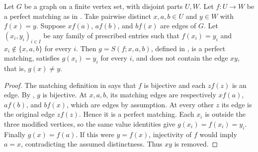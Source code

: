 \begin{lemma}
Let $G$ be a graph on a finite vertex set, with disjoint parts $U,W$.
Let $f:U\to W$ be a perfect matching as in .
Take pairwise distinct $x,a,b\in U$ and $y\in W$ with $f(x)=y$.
Suppose $xf(a)$, $af(b)$, and $bf(x)$ are edges of $G$.
Let $(x_i,y_i)_{i\in I}$ be any family of prescribed entries such that
$f(x_i)=y_i$ and $x_i\notin\{x,a,b\}$ for every $i$.
Then $g=S(f;x,a,b)$, defined in , is a
perfect matching, satisfies $g(x_i)=y_i$ for every $i$, and does not
contain the edge $xy$, that is, $g(x)\ne y$.
\end{lemma}
\begin{proof}
The matching definition in  says that $f$ is
bijective and each $zf(z)$ is an edge. By
, $g$ is bijective.
At $x,a,b$, its matching edges are respectively $xf(a)$, $af(b)$,
and $bf(x)$, which are edges by assumption. At every other $z$ its edge
is the original edge $zf(z)$. Hence it is a perfect matching.
Each $x_i$ is outside the three modified vertices, so the same value
identities give $g(x_i)=f(x_i)=y_i$. Finally $g(x)=f(a)$. If this were
$y=f(x)$, injectivity of $f$ would imply $a=x$, contradicting the
assumed distinctness. Thus $xy$ is removed.
\end{proof}

